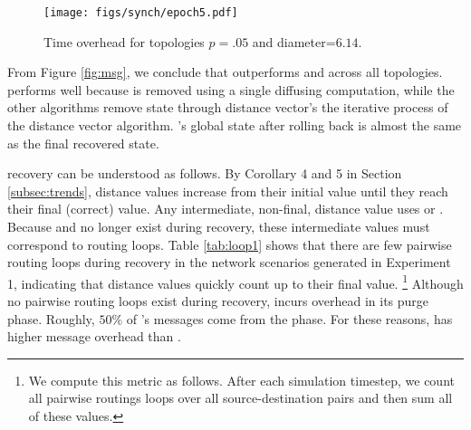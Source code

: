 \begin{figure}[t]
\centering
\texttt{[image: figs/synch/epoch5.pdf]}
\caption{Time overhead for topologies $p=.05$ and diameter=$6.14$.}
\label{fig:epoch}
\end{figure}



From Figure \ref{fig:msg}, we conclude that \cpr outperforms \purge and \second across all topologies. \cpr performs well because \badvector is removed using a single diffusing computation,  
while the other algorithms remove \badvector state through distance vector's the iterative process of the distance vector algorithm. 
\cprs's global state after rolling back is almost the same as the final recovered state.

\second recovery can be understood as follows.  By Corollary 4 and 5 in Section \ref{subsec:trends}, distance values increase from their initial value until they 
reach their final (correct) value. Any intermediate, non-final, distance value uses \badvector or \oldvectors. Because \badvector and \oldvector no longer exist during recovery,
these intermediate values must correspond to routing loops.
Table \ref{tab:loop1} shows that there are few pairwise routing loops during \second recovery in the network scenarios generated in Experiment 1, 
indicating that \second distance values quickly count up to their final value.
{\footnote {\small We compute this metric as follows. After each simulation timestep, we count all pairwise routings loops over all source-destination pairs and then sum all of these values.}}
Although no pairwise routing loops exist during \purge recovery, \purge incurs overhead in its purge phase.  Roughly, $50\%$ of \purges's messages come from the \purge phase.
For these reasons, \purge has higher message overhead than \seconds.

